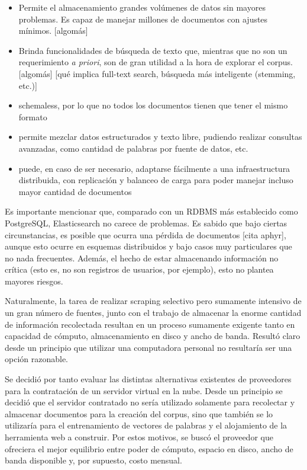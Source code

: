 \begin{itemize}

\item Permite el almacenamiento grandes volúmenes de datos sin mayores problemas. Es capaz de
manejar millones de documentos con ajustes mínimos. [algomás]

\item Brinda funcionalidades de búsqueda de texto que, mientras que no son un requerimiento
\textit{a priori}, son de gran utilidad a la hora de explorar el corpus. [algomás] [qué implica
full-text search, búsqueda más inteligente (stemming, etc.)]

\item schemaless, por lo que no todos los documentos tienen que tener el mismo formato

\item permite mezclar datos estructurados y texto libre, pudiendo realizar consultas avanzadas, como
cantidad de palabras por fuente de datos, etc.

\item puede, en caso de ser necesario, adaptarse fácilmente a una infraestructura distribuida, con
replicación y balanceo de carga para poder manejar incluso mayor cantidad de documentos

\end{itemize}

Es importante mencionar que, comparado con un RDBMS más establecido como PostgreSQL, Elasticsearch
no carece de problemas. Es sabido que bajo ciertas circunstancias, es posible que ocurra una pérdida
de documentos [cita aphyr], aunque esto ocurre en esquemas distribuidos y bajo casos muy
particulares que no nada frecuentes. Además, el hecho de estar almacenando información no crítica
(esto es, no son registros de usuarios, por ejemplo), esto no plantea mayores riesgos.

Naturalmente, la tarea de realizar scraping selectivo pero sumamente intensivo de un gran número de
fuentes, junto con el trabajo de almacenar la enorme cantidad de información recolectada resultan en un
proceso sumamente exigente tanto en capacidad de cómputo, almacenamiento en disco y ancho de
banda. Resultó claro desde un principio que utilizar una computadora personal no resultaría ser una
opción razonable.

Se decidió por tanto evaluar las distintas alternativas existentes de proveedores para la contratación de un
servidor virtual en la nube. Desde un principio se decidió que el servidor contratado no sería utilizado
solamente para recolectar y almacenar documentos para la creación del corpus, sino que también se lo
utilizaría para el entrenamiento de vectores de palabras y el alojamiento de la herramienta web a construir.
Por estos motivos, se buscó el proveedor que ofreciera el mejor equilibrio entre poder de cómputo, espacio
en disco, ancho de banda disponible y, por supuesto, costo mensual.

